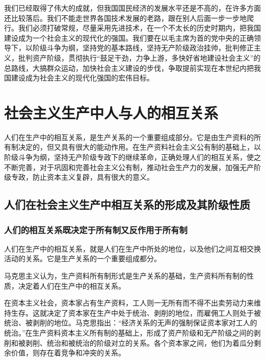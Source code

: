 \documentclass{book}
\begin{document}
我们已经取得了伟大的成就，但我国国民经济的发展水平还是不高的，在许多方面还比较落后。我们不能走世界各国技术发展的老路，跟在别人后面一步一步地爬行。我们必须打破常规，尽量采用先进技术，在一个不太长的历史时期内，把我国建设成为一个社会主义的现代化的强国。我们要在以毛主席为首的党中央的正确领导下，以阶级斗争为纲，坚持党的基本路线，坚持无产阶级政治挂帅，批判修正主义，批判资产阶级，贯彻执行“鼓足干劲，力争上游，多快好省地建设社会主义”的总路线，大搞群众运动，加快社会主义建设的步伐，争取提前实现在本世纪内把我国建设成为社会主义的现代化强国的宏伟目标。

\chapter{社会主义生产中人与人的相互关系}

人们在生产中的相互关系，是生产关系的一个重要组成部分。它是由生产资料的所有制决定的，但又具有很大的能动作用。在生产资料社会主义公有制的基础上，以阶级斗争为纲，坚持无产阶级专政下的继续革命，正确处理人们的相互关系，使之不断完善，对于巩固和完善社会主义公有制，推动社会生产力的发展，加强无产阶级专政，防止资本主义复辟，具有很大的意义。

\section{人们在社会主义生产中相互关系的形成及其阶级性质}

\subsection{人们的相互关系既决定于所有制又反作用于所有制}

人们在生产中的相互关系，就是人们在生产中所处的地位，以及他们之间互相交换活动的关系。它是生产关系的一个重要组成都分。

马克思主义认为，生产资料所有制形式是生产关系的基础，生产资料所有制的性质，决定着人们在生产中的相互关系。

在资本主义社会，资本家占有生产资料，工人则一无所有而不得不出卖劳动力来维持生存。这就决定了资本家在生产中处于统治、剥削的地位，而雇佣工人则处于被统治、被剥削的地位。马克思指出：“经济关系的无声的强制保证资本家对工人的统治。”在生产资料资本主义所有制的基础上，形成了资产阶级和无产阶级之间的剥削和被剥削、统治和被统治的阶级对立的关系。各个资本家之间，他们为着瓜分剩余价值，则存在着竞争和冲突的关系。
\end{document}
